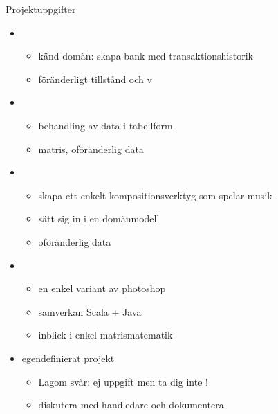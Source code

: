 \begin{SlideExtra}{Projektuppgifter}\SlideFontTiny

\begin{itemize}\SlideFontTiny
\item {}
\begin{itemize}\SlideFontTiny
\item känd domän: skapa bank med transaktionshistorik 
\item föränderligt tillstånd och v
\end{itemize}

\item {}
\begin{itemize}\SlideFontTiny
\item behandling av data i tabellform 
\item matris, oföränderlig data
\end{itemize}

\item {}
\begin{itemize}\SlideFontTiny
\item skapa ett enkelt kompositionsverktyg som spelar musik
\item sätt sig in i en domänmodell
\item oföränderlig data
\end{itemize}

\item {} 
\begin{itemize}\SlideFontTiny
\item en enkel variant av photoshop
\item samverkan Scala + Java
\item inblick i enkel matrismatematik
\end{itemize}


\item egendefinierat projekt 
\begin{itemize}\SlideFontTiny
\item Lagom svår: ej  uppgift men ta dig inte !
\item diskutera med handledare och dokumentera
\end{itemize}


\end{itemize}

\end{SlideExtra}


